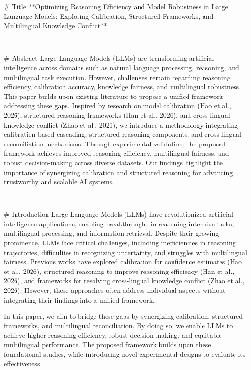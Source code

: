 # Title  
**Optimizing Reasoning Efficiency and Model Robustness in Large Language Models: Exploring Calibration, Structured Frameworks, and Multilingual Knowledge Conflict**

---

# Abstract  
Large Language Models (LLMs) are transforming artificial intelligence across domains such as natural language processing, reasoning, and multilingual task execution. However, challenges remain regarding reasoning efficiency, calibration accuracy, knowledge fairness, and multilingual robustness. This paper builds upon existing literature to propose a unified framework addressing these gaps. Inspired by research on model calibration (Hao et al., 2026), structured reasoning frameworks (Han et al., 2026), and cross-lingual knowledge conflict (Zhao et al., 2026), we introduce a methodology integrating calibration-based cascading, structured reasoning components, and cross-lingual reconciliation mechanisms. Through experimental validation, the proposed framework achieves improved reasoning efficiency, multilingual fairness, and robust decision-making across diverse datasets. Our findings highlight the importance of synergizing calibration and structured reasoning for advancing trustworthy and scalable AI systems.

---

# Introduction  
Large Language Models (LLMs) have revolutionized artificial intelligence applications, enabling breakthroughs in reasoning-intensive tasks, multilingual processing, and information retrieval. Despite their growing prominence, LLMs face critical challenges, including inefficiencies in reasoning trajectories, difficulties in recognizing uncertainty, and struggles with multilingual fairness. Previous works have explored calibration for confidence estimates (Hao et al., 2026), structured reasoning to improve reasoning efficiency (Han et al., 2026), and frameworks for resolving cross-lingual knowledge conflict (Zhao et al., 2026). However, these approaches often address individual aspects without integrating their findings into a unified framework.

In this paper, we aim to bridge these gaps by synergizing calibration, structured frameworks, and multilingual reconciliation. By doing so, we enable LLMs to achieve higher reasoning efficiency, robust decision-making, and equitable multilingual performance. The proposed framework builds upon these foundational studies, while introducing novel experimental designs to evaluate its effectiveness.

